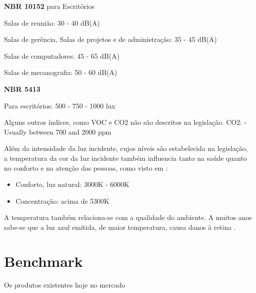 \documentclass[]{politex}
\begin{document}
\begin{citacaoLonga} %
\textbf{NBR 10152} \cite{NBR10152} para Escritórios

Salas de reunião: 30 - 40 dB(A)

Salas de gerência, Salas de projetos e de administração: 35 - 45 dB(A)

Salas de computadores: 45 - 65 dB(A)

Salas de mecanografia: 50 - 60 dB(A)

\textbf{NBR 5413} \cite{NBR5413}

Para escritórios: 500 - 750 - 1000 lux
\end{citacaoLonga}

Alguns outros índices, como VOC e CO2 não são descritos na legislação. 
CO2:
- Usually between 700 and 2000 ppm 

Além da intensidade da luz incidente, cujos níveis são estabelecida na legislação, a temperatura da cor da luz incidente também influencia tanto na saúde quanto no conforto e na atenção das pessoas, como visto em \cite{VisualComfort}: 
\begin{itemize}
\item Conforto, luz natural: 3000K - 6000K
\item Concentração: acima de 5300K 
\end{itemize}
A temperatura também relaciona-se com a qualidade do ambiente. A muitos anos sabe-se que a luz azul emitida, de maior temperatura, causa danos à retina \cite{BlueLight}. 



\chapter{Benchmark} %

Os produtos existentes hoje no mercado

%

%




\end{document}
